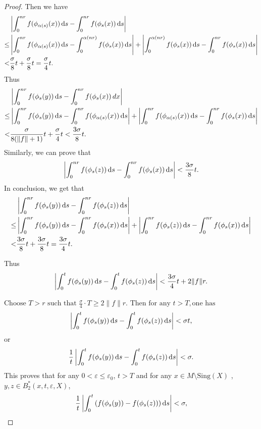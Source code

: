 \documentclass[10pt]{article}
\newtheorem*{Theorem A}{Theorem A}
\begin{document}
\begin{proof}
\noindent
Then we have
\begin{align*}
&\left| \int_0^{nr} f(\phi_{\alpha(s)}(x)) \, {\rm d}s - \int_0^{nr} f(\phi_s(x)) \, {\rm d}s \right| \\
\leq &\left| \int_0^{nr} f(\phi_{\alpha(s)}(x)) \, {\rm d}s - \int_0^{\alpha(nr)} f(\phi_s(x)) \, {\rm d}s \right| + \left| \int_0^{\alpha(nr)} f(\phi_s(x)) \, {\rm d}s - \int_0^{nr} f(\phi_s(x)) \, {\rm d}s \right| \\
< &\frac{\sigma}{8} t + \frac{\sigma}{8} t = \frac{\sigma}{4} t.
\end{align*}
Thus
\begin{align*}
&\left| \int_0^{nr} f(\phi_s(y)) \, {\rm d}s - \int_0^{nr} f(\phi_s(x)) \, dx \right| \\
\leq &\left| \int_0^{nr} f(\phi_s(y)) \, {\rm d}s - \int_0^{nr} f(\phi_{\alpha(s)}(x)) \, {\rm d}s \right| + \left| \int_0^{nr} f(\phi_{\alpha(s)}(x)) \, {\rm d}s - \int_0^{nr} f(\phi_s(x)) \, {\rm d}s \right| \\
< &\frac{\sigma}{8(\| f \| + 1)} t + \frac{\sigma}{4} t < \frac{3\sigma}{8} t.
\end{align*}
Similarly, we can prove that
\[
\left| \int_0^{nr} f(\phi_s(z)) \, {\rm d}s - \int_0^{nr} f(\phi_s(x)) \, {\rm d}s \right| < \frac{3\sigma}{8} t.
\]
In conclusion, we get that
\begin{align*}
&\left| \int_0^{nr} f(\phi_s(y)) \, {\rm d}s - \int_0^{nr} f(\phi_s(z)) \, {\rm d}s \right| \\
\leq &\left| \int_0^{nr} f(\phi_s(y)) \, {\rm d}s - \int_0^{nr} f(\phi_s(x)) \, {\rm d}s \right| + \left| \int_0^{nr} f(\phi_s(z)) \, {\rm d}s - \int_0^{nr} f(\phi_s(x)) \, {\rm d}s \right| \\
<& \frac{3\sigma}{8} t + \frac{3\sigma}{8} t = \frac{3\sigma}{4} t.
\end{align*}

\noindent
Thus
\[
\left| \int_0^t f(\phi_s(y)) \, {\rm d}s - \int_0^t f(\phi_s(z)) \, {\rm d}s \right|
< \frac{3\sigma}{4} t + 2 \| f \| r.
\]

$\text{Choose } T > r \text{ such that } \frac{\sigma}{4} \cdot T \geq 2 \| f \| r. \text{ Then for any } t > T, \text{one has}$
\[
\left| \int_0^t f(\phi_s(y)) \, {\rm d}s - \int_0^t f(\phi_s(z)) \, {\rm d}s \right| < \sigma t,
\]
or
\[
\frac{1}{t} \left| \int_0^t f(\phi_s(y)) \, {\rm d}s - \int_0^t f(\phi_s(z)) \, {\rm d}s \right| < \sigma.
\]
This proves that for any \(0 < \varepsilon \leq \varepsilon_0\), \(t > T\) and for any \(x \in M \setminus \text{Sing}(X)\) , \(y,z \in B_{2}^*(x,t,\varepsilon,X)\),
\[
\frac{1}{t} \left| \int_0^t \left( f(\phi_s(y)) - f(\phi_s(z)) \right) {\rm d}s \right| < \sigma,
\]


\end{proof}
\end{document}
